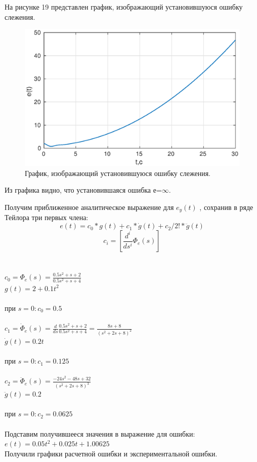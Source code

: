 \documentclass[a4paper,14pt]{article}
\begin{document}
На рисунке 19 представлен график, изображающий  установившуюся ошибку слежения.
\begin{figure}[H]
\centering
\includegraphics[width=\textwidth]{1/4_1e(t).eps}
\caption{График, изображающий  установившуюся ошибку слежения.}
\end{figure}

Из графика видно, что установившаяся ошибка е=${\infty}$.

Получим приближенное аналитическое выражение для $e_{y}(t)$ , сохранив в ряде Тейлора три первых члена:
\begin{equation}
e(t)=c_{0}*g(t)+c_{1}*\dot{g}(t)+c_{2}/2!*\ddot{g}(t)
\end{equation}
\begin{equation}
c_{i}=[\frac{d^i}{ds^i}\Phi_{e}(s)]
\end{equation}
\\
\\$c_{0}=\Phi_{e}(s)=\frac{0.5s^2+s+2}{0.5s^2+s+4}$			
\\$g(t)=2+0.1t^2$
\\
\\при $s=0: c_{0}=0.5$
\\
\\$c_{1}=\dot\Phi_{e}(s)=\frac{d}{ds}\frac{0.5s^2+s+2}{0.5s^2+s+4}=\frac{8s+8}{(s^2+2s+8)^2}$		
\\$\dot{g}(t)=0.2t$
\\
\\при $s=0: c_{1}=0.125$
\\
\\$c_{2}=\ddot\Phi_{e}(s)=\frac{-24s^2-48s+32}{(s^2+2s+8)^3}$		
\\$\ddot{g}(t)=0.2$
\\
\\при $s=0: c_{2}=0.0625$
\\
\\ Подставим получившееся значения в выражение для ошибки:
\\$e(t)=0.05t^2+0.025t+1.00625$
\\ Получили графики  расчетной ошибки  и экспериментальной ошибки.
\end{document}
